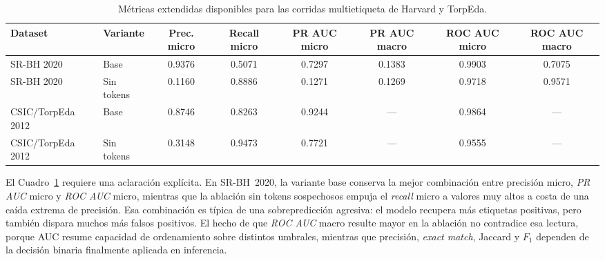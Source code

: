 \documentclass[12pt,oneside]{report}
\begin{document}
\begin{table}[H]
\centering
\caption{Métricas extendidas disponibles para las corridas multietiqueta de Harvard y TorpEda.}
\label{tab:res-ml-extra}
\scriptsize
\renewcommand{\arraystretch}{1.12}
\begin{adjustbox}{max width=\textwidth}
\begin{tabular}{llcccccc}
\toprule
\textbf{Dataset} & \textbf{Variante} & \textbf{Prec. micro} & \textbf{Recall micro} & \textbf{PR AUC micro} & \textbf{PR AUC macro} & \textbf{ROC AUC micro} & \textbf{ROC AUC macro} \\
\midrule
SR-BH 2020 & Base & 0.9376 & 0.5071 & 0.7297 & 0.1383 & 0.9903 & 0.7075 \\SR-BH 2020 & Sin tokens & 0.1160 & 0.8886 & 0.1271 & 0.1269 & 0.9718 & 0.9571 \\CSIC/TorpEda 2012 & Base & 0.8746 & 0.8263 & 0.9244 & --- & 0.9864 & --- \\CSIC/TorpEda 2012 & Sin tokens & 0.3148 & 0.9473 & 0.7721 & --- & 0.9555 & --- \\\bottomrule
\end{tabular}
\end{adjustbox}
\end{table}

El Cuadro~\ref{tab:res-ml-extra} requiere una aclaración explícita. En SR-BH~2020, la variante base conserva la mejor combinación entre precisión micro, \textit{PR AUC} micro y \textit{ROC AUC} micro, mientras que la ablación sin tokens sospechosos empuja el \textit{recall} micro a valores muy altos a costa de una caída extrema de precisión. Esa combinación es típica de una sobrepredicción agresiva: el modelo recupera más etiquetas positivas, pero también dispara muchos más falsos positivos. El hecho de que \textit{ROC AUC} macro resulte mayor en la ablación no contradice esa lectura, porque AUC resume capacidad de ordenamiento sobre distintos umbrales, mientras que precisión, \textit{exact match}, Jaccard y $F_1$ dependen de la decisión binaria finalmente aplicada en inferencia.
\end{document}
